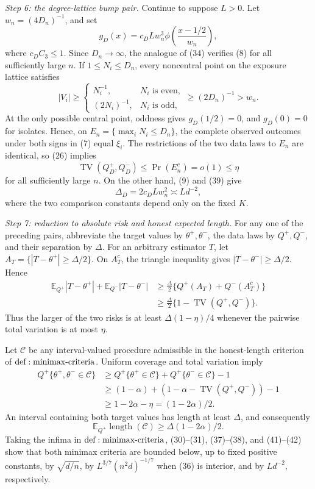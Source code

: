 \textit{Step 6: the degree-lattice bump pair.}
Continue to suppose \(L>0\).  Let \(w_n=(4D_n)^{-1}\), and set
\[
 g_D(x)=c_DLw_n^3\phi\!\left(\frac{x-1/2}{w_n}\right),
\tag{39}
\]
where \(c_DC_3\leq1\).  Since \(D_n\to\infty\), the analogue of (34) verifies (8) for all sufficiently large \(n\).  If \(1\leq N_i\leq D_n\), every noncentral point on the exposure lattice satisfies
\[
 |V_i|\geq
 \begin{cases}N_i^{-1},&N_i\text{ is even},\\(2N_i)^{-1},&N_i\text{ is odd},\end{cases}
 \geq(2D_n)^{-1}>w_n.
\tag{40}
\]
At the only possible central point, oddness gives \(g_D(1/2)=0\), and \(g_D(0)=0\) for isolates.  Hence, on
\(E_n=\{\max_iN_i\leq D_n\}\), the complete observed outcomes under both signs in (7) equal \(\xi_i\).  The restrictions of the two data laws to \(E_n\) are identical, so (26) implies
\[
 \operatorname{TV}(Q_D^+,Q_D^-)
 \leq\Pr(E_n^c)=o(1)\leq\eta
\tag{41}
\]
for all sufficiently large \(n\).  On the other hand, (9) and (39) give
\[
 \Delta_D=2c_DLw_n^2\asymp Ld^{-2},
\tag{42}
\]
where the two comparison constants depend only on the fixed \(K\).

\textit{Step 7: reduction to absolute risk and honest expected length.}
For any one of the preceding pairs, abbreviate the target values by \(\theta^+,\theta^-\), the data laws by \(Q^+,Q^-\), and their separation by \(\Delta\).  For an arbitrary estimator \(T\), let \(A_T=\{|T-\theta^+|\geq\Delta/2\}\).  On \(A_T^c\), the triangle inequality gives \(|T-\theta^-|\geq\Delta/2\).  Hence
\[
 \begin{aligned}
 \mathbb E_{Q^+}|T-\theta^+|+\mathbb E_{Q^-}|T-\theta^-|
 &\geq\frac\Delta2\{Q^+(A_T)+Q^-(A_T^c)\}\\
 &\geq\frac\Delta2\{1-\operatorname{TV}(Q^+,Q^-)\}.
 \end{aligned}
\tag{43}
\]
Thus the larger of the two risks is at least \(\Delta(1-\eta)/4\) whenever the pairwise total variation is at most \(\eta\).

Let \(\mathcal C\) be any interval-valued procedure admissible in the honest-length criterion of \({\rm def:minimax\text{-}criteria}\).  Uniform coverage and total variation imply
\[
 \begin{aligned}
 Q^+\{\theta^+,\theta^-\in\mathcal C\}
 &\geq Q^+\{\theta^+\in\mathcal C\}
      +Q^+\{\theta^-\in\mathcal C\}-1\\
 &\geq(1-\alpha)+(1-\alpha-\operatorname{TV}(Q^+,Q^-))-1\\
 &\geq1-2\alpha-\eta=(1-2\alpha)/2.
 \end{aligned}
\tag{44}
\]
An interval containing both target values has length at least \(\Delta\), and consequently
\[
 \mathbb E_{Q^+}\operatorname{length}(\mathcal C)
 \geq\Delta(1-2\alpha)/2.
\tag{45}
\]
Taking the infima in \({\rm def:minimax\text{-}criteria}\), (30)--(31), (37)--(38), and (41)--(42) show that both minimax criteria are bounded below, up to fixed positive constants, by \(\sqrt{d/n}\), by \(L^{3/7}(n^2d)^{-1/7}\) when (36) is interior, and by \(Ld^{-2}\), respectively.

